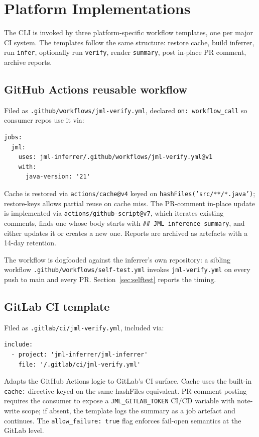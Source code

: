 \section{Platform Implementations}
\label{sec:platforms}

The CLI is invoked by three platform-specific workflow templates, one per major CI system. The templates follow the same structure: restore cache, build inferrer, run \texttt{infer}, optionally run \texttt{verify}, render \texttt{summary}, post in-place PR comment, archive reports.

\subsection{GitHub Actions reusable workflow}

Filed as {\tt .github/workflows/jml-verify.yml}, declared {\tt on: workflow\_call} so consumer repos use it via:

\begin{lstlisting}[language={}]
jobs:
  jml:
    uses: jml-inferrer/.github/workflows/jml-verify.yml@v1
    with:
      java-version: '21'
\end{lstlisting}

Cache is restored via {\tt actions/cache@v4} keyed on {\tt hashFiles('src/**/*.java')}; restore-keys allows partial reuse on cache miss. The PR-comment in-place update is implemented via {\tt actions/github-script@v7}, which iterates existing comments, finds one whose body starts with {\tt \#\# JML inference summary}, and either updates it or creates a new one. Reports are archived as artefacts with a 14-day retention.

The workflow is dogfooded against the inferrer's own repository: a sibling workflow {\tt .github/workflows/self-test.yml} invokes {\tt jml-verify.yml} on every push to main and every PR. Section~\ref{sec:selftest} reports the timing.

\subsection{GitLab CI template}

Filed as {\tt .gitlab/ci/jml-verify.yml}, included via:

\begin{lstlisting}[language={}]
include:
  - project: 'jml-inferrer/jml-inferrer'
    file: '/.gitlab/ci/jml-verify.yml'
\end{lstlisting}

Adapts the GitHub Actions logic to GitLab's CI surface. Cache uses the built-in {\tt cache:} directive keyed on the same hashFiles equivalent. PR-comment posting requires the consumer to expose a {\tt JML\_GITLAB\_TOKEN} CI/CD variable with note-write scope; if absent, the template logs the summary as a job artefact and continues. The {\tt allow\_failure: true} flag enforces fail-open semantics at the GitLab level.

